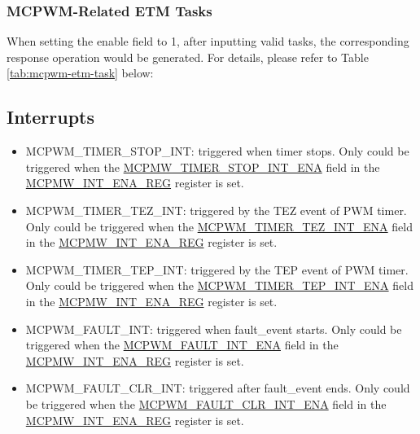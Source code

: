 \documentclass[main\_\_EN.tex]{subfiles}
\begin{document}


\subsubsection{MCPWM-Related ETM Tasks}
When setting the enable field to 1, after inputting valid tasks, the corresponding response operation would be generated. For details, please refer to Table \ref{tab:mcpwm-etm-task} below:



\subsection{Interrupts}
\label{sec:mcpwm-interrupts}
\begin{itemize}
\item \label{int:mcpwm-timer-stop}MCPWM\_TIMER\_STOP\_INT: triggered when timer stops. Only could be triggered when the \hyperref[fielddesc:MCPWMTIMER0STOPINTENA]{MCPMW\_TIMER\_STOP\_INT\_ENA} field in the  \hyperref[regdesc:MCPWMINTENAREG]{MCPMW\_INT\_ENA\_REG} register is set.
\item \label{int:mcpwm-timer-TEZ}MCPWM\_TIMER\_TEZ\_INT: triggered by the TEZ event of PWM timer. Only could be triggered when the \hyperref[fielddesc:MCPWMTIMER0TEZINTENA]{MCPWM\_TIMER\_TEZ\_INT\_ENA} field in the \hyperref[regdesc:MCPWMINTENAREG]{MCPMW\_INT\_ENA\_REG} register is set.
\item \label{int:mcpwm-timer-tep}MCPWM\_TIMER\_TEP\_INT: triggered by the TEP event of PWM timer. Only could be triggered when the \hyperref[fielddesc:MCPWMTIMER0TEPINTENA]{MCPWM\_TIMER\_TEP\_INT\_ENA} field in the \hyperref[regdesc:MCPWMINTENAREG]{MCPMW\_INT\_ENA\_REG} register is set.
\item \label{int:mcpwm-fault}MCPWM\_FAULT\_INT: triggered when fault\_event starts. Only could be triggered when the \hyperref[fielddesc:MCPWMFAULT0INTENA]{MCPWM\_FAULT\_INT\_ENA} field in the \hyperref[regdesc:MCPWMINTENAREG]{MCPMW\_INT\_ENA\_REG} register is set.
\item \label{int:mcpwm-fault-clr}MCPWM\_FAULT\_CLR\_INT: triggered after fault\_event ends. Only could be triggered when the \hyperref[fielddesc:MCPWMFAULT0CLRINTENA]{MCPWM\_FAULT\_CLR\_INT\_ENA} field in the \hyperref[regdesc:MCPWMINTENAREG]{MCPMW\_INT\_ENA\_REG} register is set.

\end{itemize}
\end{document}
